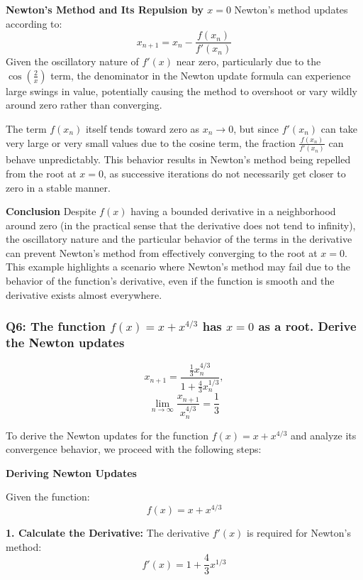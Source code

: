 \documentclass{article}
\begin{document}
\textbf{Newton’s Method and Its Repulsion by \(x = 0\)}
Newton's method updates according to:
\[
x_{n+1} = x_n - \frac{f(x_n)}{f'(x_n)}
\]
Given the oscillatory nature of \(f'(x)\) near zero, particularly due to the \(\cos\left(\frac{2}{x}\right)\) term, the denominator in the Newton update formula can experience large swings in value, potentially causing the method to overshoot or vary wildly around zero rather than converging.

The term \(f(x_n)\) itself tends toward zero as \(x_n \to 0\), but since \(f'(x_n)\) can take very large or very small values due to the cosine term, the fraction \(\frac{f(x_n)}{f'(x_n)}\) can behave unpredictably. This behavior results in Newton's method being repelled from the root at \(x = 0\), as successive iterations do not necessarily get closer to zero in a stable manner.

\textbf{Conclusion}
Despite \(f(x)\) having a bounded derivative in a neighborhood around zero (in the practical sense that the derivative does not tend to infinity), the oscillatory nature and the particular behavior of the terms in the derivative can prevent Newton's method from effectively converging to the root at \(x = 0\). This example highlights a scenario where Newton’s method may fail due to the behavior of the function's derivative, even if the function is smooth and the derivative exists almost everywhere.

\subsubsection*{Q6: The function \(f(x) = x + x^{4/3}\) has \(x = 0\) as a root. Derive the Newton updates}
\[ x_{n+1} = \frac{\frac{1}{3} x_n^{4/3}}{1 + \frac{4}{3} x_n^{1/3}}, \]
\[ \lim_{n \to \infty} \frac{x_{n+1}}{x_n^{4/3}} = \frac{1}{3} \]

To derive the Newton updates for the function \(f(x) = x + x^{4/3}\) and analyze its convergence behavior, we proceed with the following steps:

\textbf{Deriving Newton Updates}

Given the function:
\[ f(x) = x + x^{4/3} \]

\textbf{1. Calculate the Derivative: }
   The derivative \(f'(x)\) is required for Newton's method:
   \[
   f'(x) = 1 + \frac{4}{3}x^{1/3}
   \]
\end{document}
